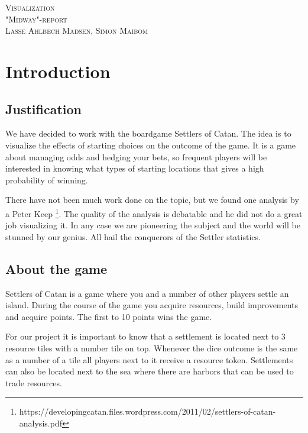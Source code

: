 \documentclass{article}
\begin{document}
\begin{center}
\textsc{\Large Visualization}\\[0.5cm]
\textsc{\large "Midway"-report}\\[0.5cm]
\textsc{\large Lasse Ahlbech Madsen, Simon Maibom}\\[0.5cm]
\vspace{1 cm}
\end{center}

\section{Introduction}

\subsection{Justification}

We have decided to work with the boardgame Settlers of Catan. The idea is to
visualize the effects of starting choices on the outcome of the game. It is a
game about managing odds and hedging your bets, so frequent players will be
interested in knowing what types of starting locations that gives a high
probability of winning.

There have not been much work done on the topic, but we found one analysis by a
Peter Keep
\footnote{https://developingcatan.files.wordpress.com/2011/02/settlers-of-catan-analysis.pdf}.
The quality of the analysis is debatable and he did not do a great job
visualizing it. In any case we are pioneering the subject and the world will
be stunned by our genius. All hail the conquerors of the Settler statistics.

\subsection{About the game}

Settlers of Catan is a game where you and a number of other players settle
an island. During the course of the game you acquire resources, build
improvements and acquire points. The first to 10 points wins the game.

For our project it is important to know that a settlement is located next
to 3 resource tiles with a number tile on top. Whenever the dice outcome is
the same as a number of a tile all players next to it receive a resource
token. Settlements can also be located next to the sea where there are harbors
that can be used to trade resources.
\end{document}
